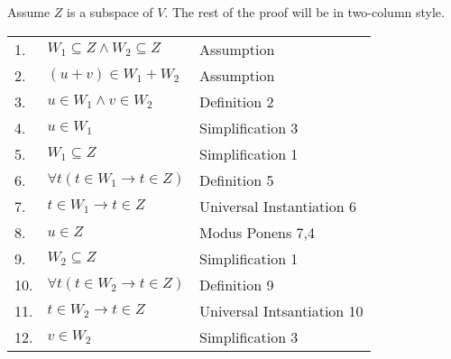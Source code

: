 \documentclass[12pt, a4paper]{article}
\begin{document}
Assume $Z$ is a subspace of $V$. The rest of the proof will be in two-column style.

\begin{table}[h!]
    \begin{center}
        \begin{tabular}{l l l}
        \hline
        
        1. & $W_1\subseteq Z\wedge W_2\subseteq Z$ & Assumption\\
        
        2. & \hspace{10mm}$(u+v)\in W_1+W_2$ & Assumption\\
        
        3. & \hspace{20mm}$u\in W_1\wedge v\in W_2$ & Definition 2\\
        
        4. & \hspace{20mm}$u\in W_1$ & Simplification 3\\
        
        5. & \hspace{20mm}$W_1\subseteq Z$ & Simplification 1\\
        
        6. & \hspace{20mm}$\forall t(t\in W_1\rightarrow t\in Z)$ & Definition 5\\
        
        7. & \hspace{20mm}$t\in W_1\rightarrow t\in Z$ & Universal Instantiation 6\\
        
        8. & \hspace{20mm}$u\in Z$ & Modus Ponens 7,4\\
        
        9. & \hspace{20mm}$W_2\subseteq Z$ & Simplification 1\\
        
        10.& \hspace{20mm}$\forall t(t\in W_2\rightarrow t\in Z)$ & Definition 9\\
        
        11.& \hspace{20mm}$t\in W_2\rightarrow t\in Z$ & Universal Intsantiation 10\\
        
        12.& \hspace{20mm}$v\in W_2$ & Simplification 3\\
        

\end{tabular}
\end{center}
\end{table}
\end{document}
